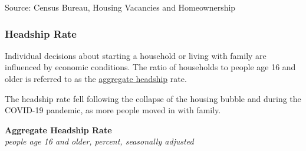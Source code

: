 \documentclass{report}
\makeatletter
\newcommand{\tbllink}[1]{\href{https://raw.githubusercontent.com/bdecon/US-chartbook/master/chartbook/data/#1}{\faTable}}
\newcommand*\short[1]{\expandafter\@gobbletwo\number\numexpr#1\relax}
\newcommand{\sbaral}[4]{
		\addplot[ybar stacked, bar width=2.3pt, draw opacity=0, fill=#1, area legend] 
			table [x=#2, y=#3, col sep=comma]{#4};}
\newcommand{\absnode}[3]{\node[below right, align=left] at (axis cs: #1,#2) {#3};}
\newcommand{\dateaxisticks}{
		date coordinates in=x, axis line style={draw=none},
		xmax={2024-01-31},
		max space between ticks=40,	    
		xtick={{1990-01-01}, {1992-01-01}, {1994-01-01}, 
			{1996-01-01}, {1998-01-01}, {2000-01-01}, 
			{2002-01-01}, {2004-01-01}, {2006-01-01},
			{2008-01-01}, {2010-01-01}, {2012-01-01}, {2014-01-01},
		    {2016-01-01}, {2018-01-01}, {2020-01-01}, {2022-01-01}, 
		    {2024-01-01}, {2026-01-01}},
		minor xtick={{1989-01-01}, {1991-01-01}, {1993-01-01},
			{1995-01-01}, {1997-01-01}, {1999-01-01}, 
			{2001-01-01}, {2003-01-01}, {2005-01-01}, {2007-01-01},
		    {2009-01-01}, {2011-01-01}, {2013-01-01}, {2015-01-01},
		    {2017-01-01}, {2019-01-01}, {2021-01-01}, {2023-01-01}, 
		    {2025-01-01}, {2027-01-01}},
		enlarge y limits={0.06}, enlarge x limits={0.01},
		xticklabel style={align=center, yshift=-2pt}, tick label style={inner sep=0pt},
		}
\newcommand{\bbar}[2]{extra #1 ticks = {{#2}}, extra #1 tick labels = ,
		extra #1 tick style = {grid=major, grid style={thick, black!25}},}
\newcommand{\stdline}[4]{\addplot[very thick, no markers, color=#1] 
		table [x=#2, y=#3, col sep=comma] {#4};	}
\newcommand{\rbars}{
		\fill[color=black!10] (axis cs:{1990-07-01},\pgfkeysvalueof{/pgfplots/ymin})
			rectangle (axis cs:{1991-03-01}, \pgfkeysvalueof{/pgfplots/ymax});
		\fill[color=black!10] (axis cs:{2007-12-01},\pgfkeysvalueof{/pgfplots/ymin})
			rectangle (axis cs:{2009-07-01}, \pgfkeysvalueof{/pgfplots/ymax});
		\fill[color=black!10] (axis cs:{2001-03-01},\pgfkeysvalueof{/pgfplots/ymin})
			rectangle (axis cs:{2001-11-01}, \pgfkeysvalueof{/pgfplots/ymax});
		\fill[color=black!10] (axis cs:{2020-02-01},\pgfkeysvalueof{/pgfplots/ymin})
			rectangle (axis cs:{2020-05-01}, \pgfkeysvalueof{/pgfplots/ymax});}
\makeatother
\begin{document}
{\begin{minipage}{1.0\textwidth}
\hspace{1mm} 

\footnotesize{Source: Census Bureau, Housing Vacancies and Homeownership}  \hfill \tbllink{hhform.csv}
\end{minipage}
\newpage
\begin{minipage}{1.0\textwidth} 
\subsubsection*{Headship Rate}
\small Individual decisions about starting a household or living with family are influenced by economic conditions. The ratio of households to people age 16 and older is referred to as the \href{https://www.federalreserve.gov/econres/notes/feds-notes/an-early-evaluation-of-the-effects-of-the-pandemic-on-living-arrangements-and-household-formation-20200807.htm}{aggregate headship} rate. 
\end{minipage}

\begin{minipage}{0.25\textwidth}
\small The headship rate fell following the collapse of the housing bubble and during the COVID-19 pandemic, as more people moved in with family. 
\end{minipage}\hspace{6mm}
\begin{minipage}{0.47\textwidth}
\normalsize \textbf{Aggregate Headship Rate}\\
\footnotesize{\textit{people age 16 and older, percent, seasonally adjusted}}
\vspace{1.9cm}


\end{minipage}}
\end{document}

